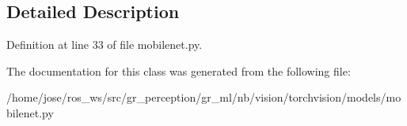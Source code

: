 \subsection{Detailed Description}


Definition at line 33 of file mobilenet.\+py.



The documentation for this class was generated from the following file\+:\begin{DoxyCompactItemize}
\item 
/home/jose/ros\+\_\+ws/src/gr\+\_\+perception/gr\+\_\+ml/nb/vision/torchvision/models/mobilenet.\+py\end{DoxyCompactItemize}
